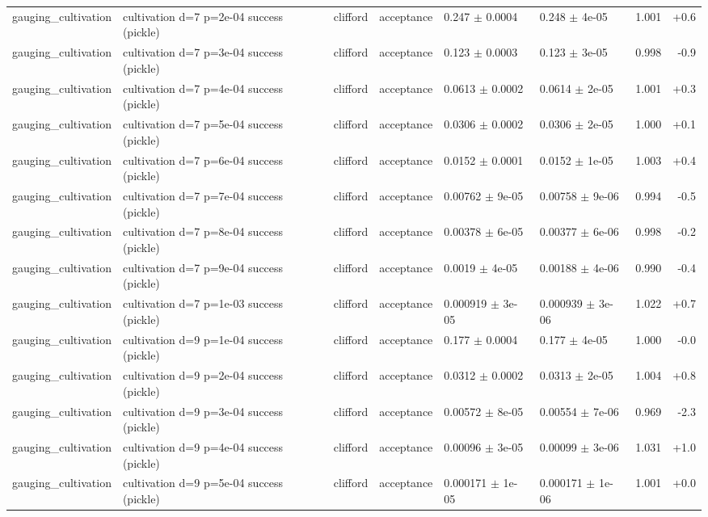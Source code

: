 \documentclass[10pt]{article}
\begin{document}
{\begin{longtable}{l l l l l l r r}
gauging\_cultivation & cultivation d=7 p=2e-04 success (pickle) & clifford & acceptance & 0.247 $\pm$ 0.0004 & 0.248 $\pm$ 4e-05 & 1.001 & +0.6 \\
gauging\_cultivation & cultivation d=7 p=3e-04 success (pickle) & clifford & acceptance & 0.123 $\pm$ 0.0003 & 0.123 $\pm$ 3e-05 & 0.998 & -0.9 \\
gauging\_cultivation & cultivation d=7 p=4e-04 success (pickle) & clifford & acceptance & 0.0613 $\pm$ 0.0002 & 0.0614 $\pm$ 2e-05 & 1.001 & +0.3 \\
gauging\_cultivation & cultivation d=7 p=5e-04 success (pickle) & clifford & acceptance & 0.0306 $\pm$ 0.0002 & 0.0306 $\pm$ 2e-05 & 1.000 & +0.1 \\
gauging\_cultivation & cultivation d=7 p=6e-04 success (pickle) & clifford & acceptance & 0.0152 $\pm$ 0.0001 & 0.0152 $\pm$ 1e-05 & 1.003 & +0.4 \\
gauging\_cultivation & cultivation d=7 p=7e-04 success (pickle) & clifford & acceptance & 0.00762 $\pm$ 9e-05 & 0.00758 $\pm$ 9e-06 & 0.994 & -0.5 \\
gauging\_cultivation & cultivation d=7 p=8e-04 success (pickle) & clifford & acceptance & 0.00378 $\pm$ 6e-05 & 0.00377 $\pm$ 6e-06 & 0.998 & -0.2 \\
gauging\_cultivation & cultivation d=7 p=9e-04 success (pickle) & clifford & acceptance & 0.0019 $\pm$ 4e-05 & 0.00188 $\pm$ 4e-06 & 0.990 & -0.4 \\
gauging\_cultivation & cultivation d=7 p=1e-03 success (pickle) & clifford & acceptance & 0.000919 $\pm$ 3e-05 & 0.000939 $\pm$ 3e-06 & 1.022 & +0.7 \\
gauging\_cultivation & cultivation d=9 p=1e-04 success (pickle) & clifford & acceptance & 0.177 $\pm$ 0.0004 & 0.177 $\pm$ 4e-05 & 1.000 & -0.0 \\
gauging\_cultivation & cultivation d=9 p=2e-04 success (pickle) & clifford & acceptance & 0.0312 $\pm$ 0.0002 & 0.0313 $\pm$ 2e-05 & 1.004 & +0.8 \\
gauging\_cultivation & cultivation d=9 p=3e-04 success (pickle) & clifford & acceptance & 0.00572 $\pm$ 8e-05 & 0.00554 $\pm$ 7e-06 & 0.969 & -2.3 \\
gauging\_cultivation & cultivation d=9 p=4e-04 success (pickle) & clifford & acceptance & 0.00096 $\pm$ 3e-05 & 0.00099 $\pm$ 3e-06 & 1.031 & +1.0 \\
gauging\_cultivation & cultivation d=9 p=5e-04 success (pickle) & clifford & acceptance & 0.000171 $\pm$ 1e-05 & 0.000171 $\pm$ 1e-06 & 1.001 & +0.0 \\

\end{longtable}}
\end{document}
